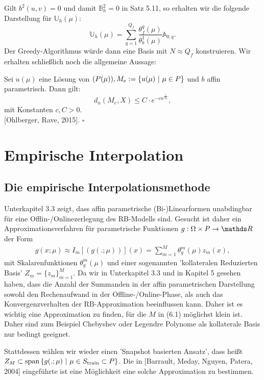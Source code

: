 Gilt $b^2(u,v)=0$ und damit $\mathbb{B}_h^2 =0$ in Satz 5.11, so erhalten wir die folgende Darstellung für $\mathbb{U}_h(\mu)$:
\[
\mathbb{U}_h(\mu) = \sum_{q=1}^{Q_f} \frac{\theta_f^q(\mu)}{\theta_b^1(\mu)} \mathbb{A}_{0,q}.
\]
Der Greedy-Algorithmus würde dann eine Basis mit $N \approx Q_f$ konstruieren.
Wir erhalten schließlich noch die allgemeine Aussage:

Sei $u(\mu)$ eine Lösung von $(P(\mu)), M_e := \left\{u(\mu)~|~\mu\in P\right\}$ und $b$ affin parametrisch.
Dann gilt:
\[
d_n(M_e,X) \le C\cdot e^{-cn^{\frac{1}{Q_b}}},
\]
mit Konstanten $c,C>0$.\\

 [Ohlberger, Rave, 2015].
\hfill $\square$

\section{Empirische Interpolation}

\subsection{Die empirische Interpolationsmethode}
Unterkapitel 3.3 zeigt, dass affin parametrische (Bi-)Linearformen unabdingbar für eine Offlin-/Onlinezerlegung des RB-Modells sind.
Gesucht ist daher ein Approximationsverfahren für parametrische Funktionen $g:\Omega\times P\to \R$ der Form
\begin{align}
g(x;\mu) \approx I_m[(g(.;\mu))](x) = \sum_{m=1}^M \theta_g^m(\mu)z_m(x),
\end{align}
mit Skalarenfunktionen $\theta_g^m(\mu)$ und einer sogenannten 'kollateralen Reduzierten Basis' $Z_m=\{z_m\}_{m=1}^M$.
Da wir in Unterkapitel 3.3 und in Kapitel 5 gesehen haben, dass die Anzahl der Summanden in der affin parametrischen Darstellung sowohl den Rechenaufwand in der Offline-/Online-Phase, als auch das Konvergenzverhalten der RB-Approximation beeinflussen kann.
Daher ist es wichtig eine Approximation zu finden, für die $M$ in (6.1) möglichst klein ist.
Daher sind zum Beispiel Chebyshev oder Legendre Polynome  als kollaterale Basis nur bedingt geeignet.

Stattdessen wählen wir wieder einen 'Snapshot basierten Ansatz', dass heißt $Z_M\subset \operatorname{span} \left\{g(.;\mu)~|~\mu\in S_{\operatorname{train}}\subset P\right\}$.
Die in [Barrault, Meday, Nguyen, Patera, 2004] eingeführte  ist eine Möglichkeit eine solche Approximation zu bestimmen.

